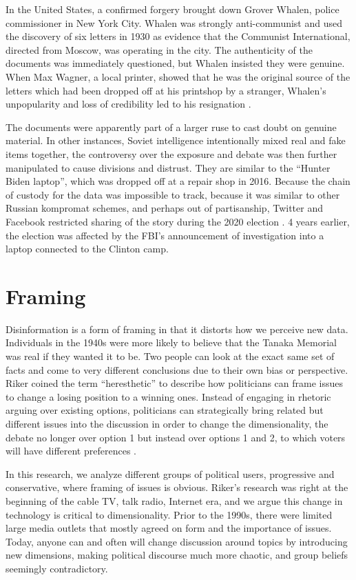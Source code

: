 \documentclass[doublespacing]{utdthesis}
\let\cite=\citep
\begin{document}
In the United States, a confirmed forgery brought down Grover Whalen, police commissioner in New York City.
Whalen was strongly anti-communist and used the discovery of six letters in 1930 as evidence that the Communist International, directed from Moscow, was operating in the city.
The authenticity of the documents was immediately questioned, but Whalen insisted they were genuine.
When Max Wagner, a local printer, showed that he was the original source of the letters which had been dropped off at his printshop by a stranger, Whalen's unpopularity and loss of credibility led to his resignation \cite[ch. 3]{rid2020}.

The documents were apparently part of a larger ruse to cast doubt on genuine material.
In other instances, Soviet intelligence intentionally mixed real and fake items together, the controversy over the exposure and debate was then further  manipulated to cause divisions and distrust.
They are similar to the ``Hunter Biden laptop'', which was dropped off at a repair shop in 2016.
Because the chain of custody for the data was impossible to track, because it was similar to other Russian kompromat schemes, and perhaps out of partisanship, Twitter and Facebook restricted sharing of the story during the 2020 election \cite{roose2020}.
4 years earlier, the election was affected by the FBI's announcement of investigation into a laptop connected to the Clinton camp. 

\section{Framing}

Disinformation is a form of framing in that it distorts how we perceive new data.
Individuals in the 1940s were more likely to believe that the Tanaka Memorial was real if they wanted it to be.
Two people can look at the exact same set of facts and come to very different conclusions due to their own bias or perspective.
Riker coined the term ``heresthetic'' to describe how politicians can frame issues to change a losing position to a winning ones.
Instead of engaging in rhetoric arguing over existing options, politicians can strategically bring related but different issues into the discussion in order to change the dimensionality, the debate no longer over option 1 but instead over options 1 and 2, to which voters will have different preferences \cite{riker1986}.

In this research, we analyze different groups of political users, progressive and conservative, where framing of issues is obvious.
Riker's research was right at the beginning of the cable TV, talk radio, Internet era, and we argue this change in technology is critical to dimensionality.
Prior to the 1990s, there were limited large media outlets that mostly agreed on form and the importance of issues.
Today, anyone can and often will change discussion around topics by introducing new dimensions, making political discourse much more chaotic, and group beliefs seemingly contradictory.
\end{document}
